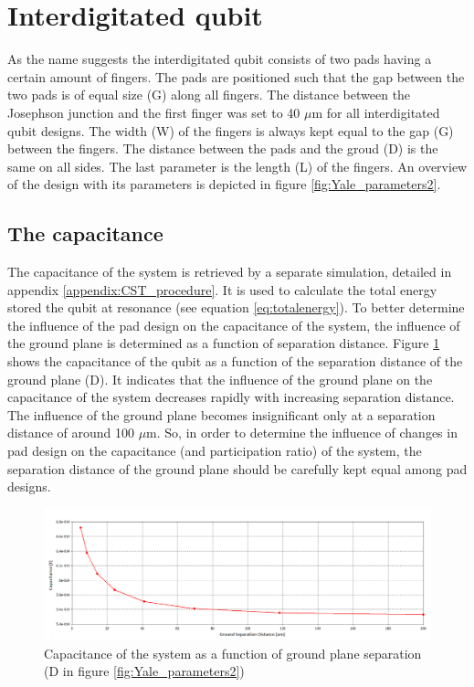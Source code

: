 \clearpage
\section{Interdigitated qubit}
As the name suggests the interdigitated qubit consists of two pads having a certain amount of fingers. The pads are positioned such that the gap between the two pads is of equal size (G) along all fingers. The distance between the Josephson junction and the first finger was set to 40 \(\mu\)m for all interdigitated qubit designs. The width (W) of the fingers is always kept equal to the gap (G) between the fingers. The distance between the pads and the groud (D) is the same on all sides. The last parameter is the length (L) of the fingers. An overview of the design with its parameters is depicted in figure \ref{fig:Yale_parameters2}.

\subsection{The capacitance}
The capacitance of the system is retrieved by a separate simulation, detailed in appendix \ref{appendix:CST_procedure}. It is used to calculate the total energy stored the qubit at resonance (see equation \eqref{eq:totalenergy}).
To better determine the influence of the pad design on the capacitance of the system, the influence of the ground plane is determined as a function of separation distance. Figure \ref{fig:capacitance_vs_slotsize} shows the capacitance of the qubit as a function of the separation distance of the ground plane (D). It indicates that the influence of the ground plane on the capacitance of the system decreases rapidly with increasing separation distance. The influence of the ground plane becomes insignificant only at a separation distance of around 100 \(\mu\)m. So, in order to determine the influence of changes in pad design on the capacitance (and participation ratio) of the system, the separation distance of the ground plane should be carefully kept equal among pad designs.  

\begin{figure}
	\centering
	\includegraphics[width = \textwidth]{Figures/capacitance_vs_slotsize_edit}
	\caption{Capacitance of the system as a function of ground plane separation (D in figure \ref{fig:Yale_parameters2})}
	\label{fig:capacitance_vs_slotsize}
\end{figure}


